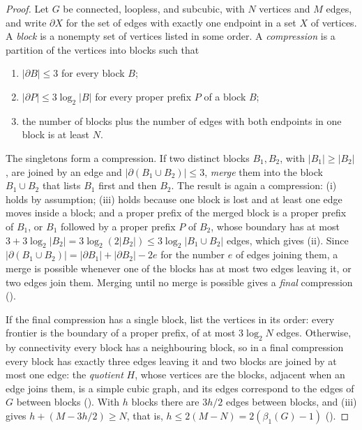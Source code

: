 \documentclass[11pt]{article}
\theoremstyle{plain}
\theoremstyle{definition}
\theoremstyle{remark}
\newcommand{\card}[1]{\lvert #1\rvert}
\begin{document}
\begin{proof}
Let $G$ be connected, loopless, and subcubic, with $N$ vertices and $M$ edges, and write
$\partial X$ for the set of edges with exactly one endpoint in a set $X$ of vertices. A
\emph{block} is a nonempty set of vertices listed in some order. A \emph{compression} is a
partition of the vertices into blocks such that
\begin{enumerate}[label=(\roman*)]
\item $\card{\partial B} \le 3$ for every block $B$;
\item $\card{\partial P} \le 3\log_2\card B$ for every proper prefix $P$ of a block $B$;
\item the number of blocks plus the number of edges with both endpoints in one block is at
  least $N$.
\end{enumerate}
The singletons form a compression. If two distinct blocks $B_1, B_2$, with
$\card{B_1} \ge \card{B_2}$, are joined by an edge and $\card{\partial(B_1 \cup B_2)} \le 3$,
\emph{merge} them into the block $B_1 \cup B_2$ that lists $B_1$ first and then $B_2$. The result
is again a compression: (i) holds by assumption; (iii) holds because one block is lost and at
least one edge moves inside a block; and a proper prefix of the merged block is a proper prefix
of $B_1$, or $B_1$ followed by a proper prefix $P$ of $B_2$, whose boundary has at most
$3 + 3\log_2\card{B_2} = 3\log_2(2\card{B_2}) \le 3\log_2\card{B_1 \cup B_2}$ edges, which gives
(ii). Since $\card{\partial(B_1 \cup B_2)} = \card{\partial B_1} + \card{\partial B_2} - 2e$ for the
number $e$ of edges joining them, a merge is possible whenever one of the blocks has at most two
edges leaving it, or two edges join them. Merging until no merge is possible gives a \emph{final}
compression ().

If the final compression has a single block, list the vertices in its order: every frontier is
the boundary of a proper prefix, of at most $3\log_2 N$ edges. Otherwise, by connectivity every
block has a neighbouring block, so in a final compression every block has exactly three edges
leaving it and two blocks are joined by at most one edge: the \emph{quotient} $H$, whose
vertices are the blocks, adjacent when an edge joins them, is a simple cubic graph, and its
edges correspond to the edges of $G$ between blocks
(). With $h$ blocks there are $3h/2$ edges between
blocks, and (iii) gives $h + (M - 3h/2) \ge N$, that is, $h \le 2(M - N) = 2(\beta_1(G) - 1)$
().


\end{proof}
\end{document}
